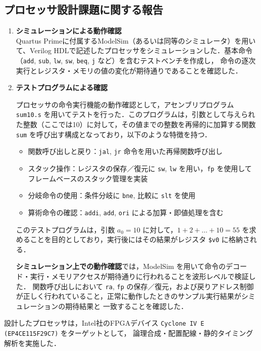 \documentclass[autodetect-engine,dvi=dvipdfmx,ja=standard,
               a4j,11pt]{bxjsarticle}
\begin{document}
\subsection{プロセッサ設計課題に関する報告}
\begin{enumerate}
  \item \textbf{シミュレーションによる動作確認} \\
  Quartus Primeに付属するModelSim（あるいは同等のシミュレータ）を用いて、Verilog HDLで記述したプロセッサをシミュレーションした．基本命令（\texttt{add}, \texttt{sub}, \texttt{lw}, \texttt{sw}, \texttt{beq}, \texttt{j} など）を含むテストベンチを作成し，
  命令の逐次実行とレジスタ・メモリの値の変化が期待通りであることを確認した．
  \item \textbf{テストプログラムによる確認}

プロセッサの命令実行機能の動作確認として，アセンブリプログラム \texttt{sum10.s} を用いてテストを行った．このプログラムは，引数として与えられた整数（ここでは10）に対して，その値までの整数を再帰的に加算する関数 \texttt{sum} を呼び出す構成となっており，以下のような特徴を持つ．

\begin{itemize}
  \item 関数呼び出しと戻り：\texttt{jal}, \texttt{jr} 命令を用いた再帰関数呼び出し
  \item スタック操作：レジスタの保存／復元に \texttt{sw}, \texttt{lw} を用い，\texttt{fp} を使用してフレームベースのスタック管理を実装
  \item 分岐命令の使用：条件分岐に \texttt{bne}, 比較に \texttt{slt} を使用
  \item 算術命令の確認：\texttt{addi}, \texttt{add}, \texttt{ori} による加算・即値処理を含む
\end{itemize}

このテストプログラムは，引数 $a_0 = 10$ に対して，$1 + 2 + \dots + 10 = 55$ を求めることを目的としており，実行後にはその結果がレジスタ \texttt{\$v0} に格納される．

\textbf{シミュレーション上での動作確認}では，ModelSim を用いて命令のデコード・実行・メモリアクセスが期待通りに行われることを波形レベルで検証した．
関数呼び出しにおいて \texttt{ra}, \texttt{fp} の保存／復元，および戻りアドレス制御が正しく行われていること，正常に動作したときのサンプル実行結果がシミュレーションの期待結果と
一致することを確認した．
\end{enumerate}
設計したプロセッサは，Intel社のFPGAデバイス \texttt{Cyclone IV E (EP4CE115F29C7)} をターゲットとして，
論理合成・配置配線・静的タイミング解析を実施した．
\end{document}
